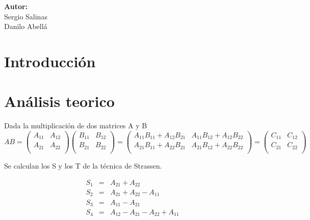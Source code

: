 \documentclass[12pt,letterpaper]{scrartcl}
\begin{document}
\begin{titlepage}
\begin{center}
\begin{minipage}[l]{0.4\textwidth}
	\begin{flushright}

		\textbf{\textsf{Autor:}}\\
		\linespread{1}
		\large Sergio Salinas\\
		\large Danilo Abellá\\

	\end{flushright}
\end{minipage}

\end{center}

\end{titlepage}



\newpage

\tableofcontents

\newpage
\section{Introducción}

\section{Análisis teorico}

Dada la multiplicación de dos matrices  A y B
$$
AB =
\begin{pmatrix}
A_{11} & A_{12} \\
A_{21} & A_{22}\\
\end{pmatrix}
\begin{pmatrix}
B_{11} & B_{12} \\
B_{21} & B_{22}\\
\end{pmatrix}
 = \begin{pmatrix}
A_{11} B_{11} + A_{12} B_{21} & A_{11} B_{12} + A_{12} B_{22}\\
A_{21} B_{11} + A_{22} B_{21} & A_{21} B_{12} + A_{22} B_{22}\\
\end{pmatrix}
=
\begin{pmatrix}
C_{11} & C_{12} \\
C_{21} & C_{22}\\
\end{pmatrix}
$$

Se calculan los S y los T de la técnica de Strassen.


\[
\begin{array}{lcl}
	S_1 &=& A_{21} + A_{22} \\
	S_2 &=& A_{21} + A_{22} - A_{11} \\
	S_3 &=& A_{11} - A_{21}\\
	S_4 &=& A_{12} -A_{21} - A_{22} + A_{11} \\
\end{array}
\]
\end{document}
